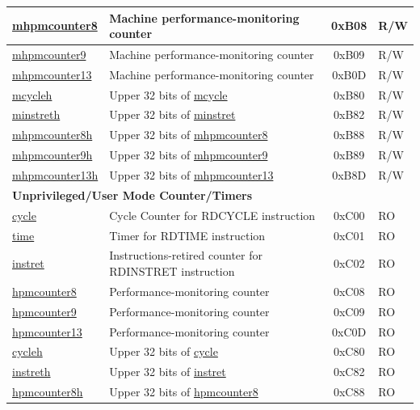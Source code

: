\begin{longtable}{ | p{4.0cm} | p{8.4cm} | c | l | }
\hyperref[regdesc:MHPMCOUNTER8]{mhpmcounter8} & Machine performance-monitoring counter & 0xB08 & R/W \\\hline
\hyperref[regdesc:MHPMCOUNTER9]{mhpmcounter9} & Machine performance-monitoring counter & 0xB09 & R/W \\\hline
\hyperref[regdesc:MHPMCOUNTER13]{mhpmcounter13} & Machine performance-monitoring counter & 0xB0D & R/W \\\hline
\hyperref[regdesc:MCYCLEH]{mcycleh} & Upper 32 bits of \hyperref[regdesc:MCYCLE]{mcycle} & 0xB80 & R/W \\\hline
\hyperref[regdesc:MINSTRETH]{minstreth} & Upper 32 bits of \hyperref[regdesc:MINSTRET]{minstret}  & 0xB82 & R/W \\\hline
\hyperref[regdesc:MHPMCOUNTER8H]{mhpmcounter8h} & Upper 32 bits of \hyperref[regdesc:MHPMCOUNTER8]{mhpmcounter8} & 0xB88 & R/W \\\hline
\hyperref[regdesc:MHPMCOUNTER9H]{mhpmcounter9h} & Upper 32 bits of \hyperref[regdesc:MHPMCOUNTER9]{mhpmcounter9} & 0xB89 & R/W \\\hline
\hyperref[regdesc:MHPMCOUNTER13H]{mhpmcounter13h} & Upper 32 bits of \hyperref[regdesc:MHPMCOUNTER13]{mhpmcounter13} & 0xB8D & R/W \\\hline
\multicolumn{4}{|l|}{\textbf{Unprivileged/User Mode Counter/Timers }} \\\hline
\hyperref[regdesc:CYCLE]{cycle} & Cycle Counter for RDCYCLE instruction & 0xC00 & RO\\\hline
\hyperref[regdesc:TIME]{time} & Timer for RDTIME instruction & 0xC01 & RO \\\hline
\hyperref[regdesc:INSTRET]{instret} & Instructions-retired counter for RDINSTRET instruction & 0xC02 & RO \\\hline
\hyperref[regdesc:HPMCOUNTER8]{hpmcounter8} & Performance-monitoring counter & 0xC08 & RO \\\hline
\hyperref[regdesc:HPMCOUNTER9]{hpmcounter9} & Performance-monitoring counter & 0xC09 & RO \\\hline
\hyperref[regdesc:HPMCOUNTER13]{hpmcounter13} & Performance-monitoring counter & 0xC0D & RO \\\hline
\hyperref[regdesc:CYCLEH]{cycleh} & Upper 32 bits of \hyperref[regdesc:CYCLE]{cycle} & 0xC80 & RO \\\hline
\hyperref[regdesc:INSTRETH]{instreth} & Upper 32 bits of \hyperref[regdesc:INSTRET]{instret}  & 0xC82 & RO \\\hline
\hyperref[regdesc:HPMCOUNTER8H]{hpmcounter8h} & Upper 32 bits of \hyperref[regdesc:HPMCOUNTER8]{hpmcounter8} & 0xC88 & RO \\\hline

\end{longtable}
